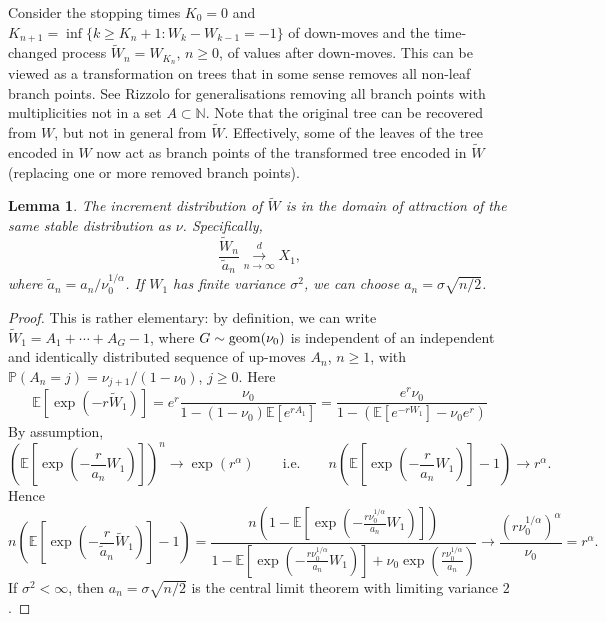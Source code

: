 \documentclass[11pt,a4paper]{article}
\newtheorem{lm}[prop]{Lemma}
\newcommand{\convd}{\overset{d}{\underset{{n\rightarrow \infty}}{\longrightarrow}}}
\newcommand{\bP}{\mathbb{P}}
\newcommand{\bN}{\mathbb{N}}
\newcommand{\bE}{\mathbb{E}}
\newcommand{\lambdaLaplace}{r}
\begin{document}
Consider the stopping times $K_0=0$ and $K_{n+1}=\inf\{k\ge K_n+1\colon W_k-W_{k-1}=-1\}$ of down-moves and the time-changed process $\widetilde{W}_n=W_{K_n}$, $n\ge 0$, of values after down-moves. This can be viewed as a transformation on trees that in some sense removes all non-leaf branch points. See Rizzolo \cite{Riz13} for generalisations removing all branch points with multiplicities not in a set $A\subset\bN$. Note that the original tree can be recovered from $W$, but not in general from $\widetilde{W}$. Effectively, some of the leaves of the tree encoded in $W$ now act as branch points of the transformed tree encoded in $\widetilde{W}$ (replacing one or more removed branch points).
\begin{lm}\label{lem2.1} The increment distribution of $\widetilde{W}$ is in the domain of attraction of the same stable distribution as $\nu$. Specifically,
  $$\frac{\widetilde{W}_n}{\widetilde{a}_n}\convd X_1,$$
  where $\widetilde{a}_n=a_n/\nu_0^{1/\alpha}$. If $W_1$ has finite variance $\sigma^2$, we can choose $a_n=\sigma\sqrt{n/2}$.
\end{lm}
\begin{proof} This is rather elementary: by definition, we can write $\widetilde{W}_1=A_1+\cdots+A_G-1$, where
  $G\sim{\rm geom}(\nu_0)$ is independent of an independent and identically distributed sequence of up-moves
  $A_n$, $n\ge 1$, with $\bP(A_n=j)=\nu_{j+1}/(1-\nu_0)$, $j\ge 0$. Here
  $$\bE\left[\exp\left(-\lambdaLaplace\widetilde{W}_1\right)\right]=e^\lambdaLaplace\frac{\nu_0}{1-(1-\nu_0)\bE[e^{\lambdaLaplace A_1}]}=\frac{e^\lambdaLaplace\nu_0}{1-\left(\bE[e^{-\lambdaLaplace W_1}]-\nu_0e^\lambdaLaplace\right)}$$
  By assumption,
  $$\left(\bE\left[\exp\left(-\frac{\lambdaLaplace}{a_n}W_1\right)\right]\right)^n\longrightarrow\exp(\lambdaLaplace^\alpha)\qquad\mbox{i.e.}\qquad n\left(\bE\left[\exp\left(-\frac{\lambdaLaplace}{a_n}W_1\right)\right]-1\right)\longrightarrow\lambdaLaplace^\alpha.$$
  Hence
  $$n\left(\bE\left[\exp\left(-\frac{\lambdaLaplace}{\widetilde{a}_n}\widetilde{W}_1\right)\right]-1\right)
    =\frac{n\left(1-\bE\left[\exp\left(-\frac{\lambdaLaplace\nu_0^{1/\alpha}}{a_n}W_1\right)\right]\right)}{1-\bE\left[\exp\left(-\frac{\lambdaLaplace\nu_0^{1/\alpha}}{a_n}W_1\right)\right]+\nu_0\exp\left(\frac{\lambdaLaplace\nu_0^{1/\alpha}}{a_n}\right)}\longrightarrow\frac{(\lambdaLaplace\nu_0^{1/\alpha})^\alpha}{\nu_0}=\lambdaLaplace^\alpha.$$
  If $\sigma^2<\infty$, then $a_n=\sigma\sqrt{n/2}$ is the central limit theorem with limiting variance $2$.
\end{proof}
\end{document}
